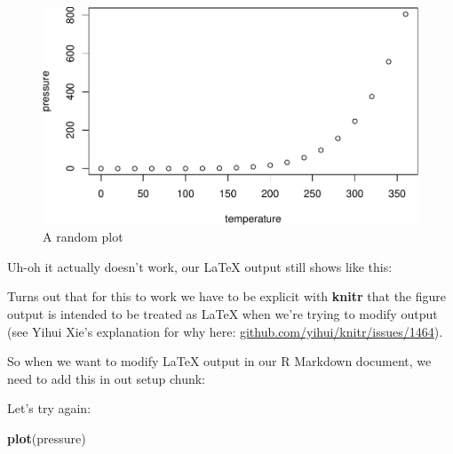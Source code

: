 \documentclass[sigchi, ]{acmart}
\newenvironment{Shaded}{\begin{snugshade}}{\end{snugshade}}
\newcommand{\ControlFlowTok}[1]{\textcolor[rgb]{0.13,0.29,0.53}{\textbf{#1}}}
\newcommand{\DataTypeTok}[1]{\textcolor[rgb]{0.13,0.29,0.53}{#1}}
\newcommand{\KeywordTok}[1]{\textcolor[rgb]{0.13,0.29,0.53}{\textbf{#1}}}
\newcommand{\NormalTok}[1]{#1}
\newcommand{\OperatorTok}[1]{\textcolor[rgb]{0.81,0.36,0.00}{\textbf{#1}}}
\begin{document}
\begin{figure}
\centering
\includegraphics{how-to-create-your-own-chunk-options-in-r-markdown_files/figure-latex/my-description-1.pdf}
\caption{\label{fig:my-description}A random plot}
\end{figure}

Uh-oh it actually doesn't work, our LaTeX output still shows like this:

Turns out that for this to work we have to be explicit with \textbf{knitr} that the figure output is intended to be treated as LaTeX when we're trying to modify output (see Yihui Xie's explanation for why here: \href{https://github.com/yihui/knitr/issues/1464}{github.com/yihui/knitr/issues/1464}).

So when we want to modify LaTeX output in our R Markdown document, we need to add this in out setup chunk:

\begin{Shaded}
\end{Shaded}

Let's try again:

\begin{Shaded}
\begin{Highlighting}[]
\KeywordTok{plot}\NormalTok{(pressure)}
\end{Highlighting}
\end{Shaded}
\end{document}
